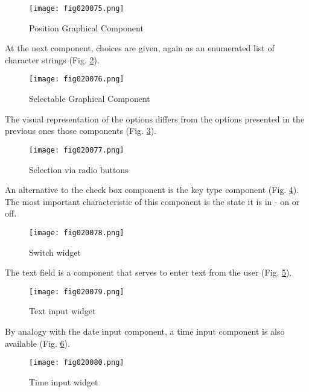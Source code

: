 \begin{figure}[H]
   \centering
   \texttt{[image: fig020075.png]}
   \caption{Position Graphical Component}
\label{fig020075}
\end{figure}

At the next component, choices are given, again as an enumerated list of character strings (Fig. \ref{fig020076}).

\begin{figure}[H]
   \centering
   \texttt{[image: fig020076.png]}
   \caption{Selectable Graphical Component}
\label{fig020076}
\end{figure}

The visual representation of the options differs from the options presented in the previous ones those components (Fig. \ref{fig020077}).

\begin{figure}[H]
   \centering
   \texttt{[image: fig020077.png]}
   \caption{Selection via radio buttons}
\label{fig020077}
\end{figure}

An alternative to the check box component is the key type component (Fig. \ref{fig020078}). The most important characteristic of this component is the state it is in - on or off.

\begin{figure}[H]
   \centering
   \texttt{[image: fig020078.png]}
   \caption{Switch widget}
\label{fig020078}
\end{figure}

The text field is a component that serves to enter text from the user (Fig. \ref{fig020079}).

\begin{figure}[H]
   \centering
   \texttt{[image: fig020079.png]}
   \caption{Text input widget}
\label{fig020079}
\end{figure}

By analogy with the date input component, a time input component is also available (Fig. \ref{fig020080}).

\begin{figure}[H]
   \centering
   \texttt{[image: fig020080.png]}
   \caption{Time input widget}
\label{fig020080}
\end{figure}

